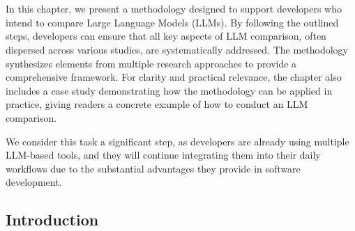 \chapter{\thesispointoneuf}
\label{chapter_2}

In this chapter, we present a methodology designed to support developers who intend to compare Large Language Models (LLMs).
By following the outlined steps, developers can ensure that all key aspects of LLM comparison, often dispersed across various studies, are systematically addressed.
The methodology synthesizes elements from multiple research approaches to provide a comprehensive framework.
For clarity and practical relevance, the chapter also includes a case study demonstrating how the methodology can be applied in practice, giving readers a concrete example of how to conduct an LLM comparison.

We consider this task a significant step, as developers are already using multiple LLM-based tools, and they will continue integrating them into their daily workflows due to the substantial advantages they provide in software development.

\section{Introduction}
\label{l:introduction}



